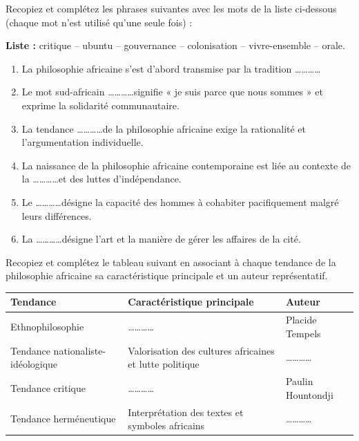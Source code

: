 \documentclass[11pt]{article}
\begin{document}
\begin{exercice}[Complétion]
Recopiez et complétez les phrases suivantes avec les mots de la liste ci-dessous (chaque mot n'est utilisé qu'une seule fois) :

\textbf{Liste :} critique -- ubuntu -- gouvernance -- colonisation -- vivre-ensemble -- orale.

\begin{enumerate}
\item La philosophie africaine s'est d'abord transmise par la tradition \ldots\ldots\ldots\ldots
\item Le mot sud-africain \ldots\ldots\ldots\ldots signifie « je suis parce que nous sommes » et exprime la solidarité communautaire.
\item La tendance \ldots\ldots\ldots\ldots de la philosophie africaine exige la rationalité et l'argumentation individuelle.
\item La naissance de la philosophie africaine contemporaine est liée au contexte de la \ldots\ldots\ldots\ldots et des luttes d'indépendance.
\item Le \ldots\ldots\ldots\ldots désigne la capacité des hommes à cohabiter pacifiquement malgré leurs différences.
\item La \ldots\ldots\ldots\ldots désigne l'art et la manière de gérer les affaires de la cité.
\end{enumerate}
\end{exercice}

\begin{exercice}
Recopiez et complétez le tableau suivant en associant à chaque tendance de la philosophie africaine sa caractéristique principale et un auteur représentatif.

\begin{center}
\begin{tabular}{|p{4cm}|p{6cm}|p{4cm}|}
\hline
\textbf{Tendance} & \textbf{Caractéristique principale} & \textbf{Auteur} \\
\hline
Ethnophilosophie & \ldots\ldots\ldots\ldots & Placide Tempels \\
\hline
Tendance nationaliste-idéologique & Valorisation des cultures africaines et lutte politique & \ldots\ldots\ldots\ldots \\
\hline
Tendance critique & \ldots\ldots\ldots\ldots & Paulin Hountondji \\
\hline
Tendance herméneutique & Interprétation des textes et symboles africains & \ldots\ldots\ldots\ldots \\
\hline
\end{tabular}
\end{center}
\end{exercice}
\end{document}
